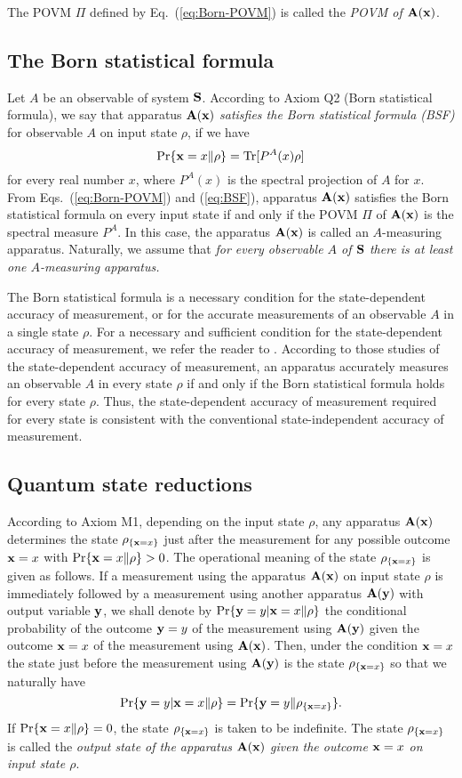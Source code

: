 \documentclass[graybox]{svmult}
\newcommand{\eeq}{\end{equation}}
\newcommand{\beql}[1]{\begin{equation}\label{eq:#1}}
\newcommand{\bA}{{\bf A}}
\newcommand{\bS}{{\bf S}}
\newcommand{\rh}{\rho}
\newcommand{\Eq}[1]{Eq.~(\ref{eq:#1})}
\newcommand{\Tr}{\mbox{\rm Tr}}
\newcommand{\bx}{{\bf x}}
\newcommand{\by}{{\bf y}}
\newcommand{\eq}[1]{(\ref{eq:#1})}
\begin{document}
The POVM $\Pi$ defined by \Eq{Born-POVM} is called the {\em POVM of
$\bA(\bx)$}.  


\subsection{The Born statistical formula}

Let $A$ be an observable of system $\bS$.
According to Axiom Q2 (Born statistical formula),
we say that apparatus $\bA(\bx)$ {\em satisfies the Born statistical
formula (BSF)} for observable $A$ on input state $\rh$, if we have
\beql{BSF}
\Pr\{\bx=x\|\rh\}=\Tr[P^{A}(x)\rh]
\eeq
for every real number $x$, 
where  $P^{A}(x)$ is the spectral projection of $A$ for $x$.
From Eqs.~\eq{Born-POVM} and \eq{BSF}, apparatus $\bA(\bx)$  
satisfies the Born statistical formula on every input state if and only if 
the POVM $\Pi$ of $\bA(\bx)$ is the spectral measure $P^{A}$.
In this case, the apparatus $\bA(\bx)$ is called an $A$-measuring apparatus.
Naturally, we assume that {\em for every observable $A$ of $\bS$ there 
is at least one $A$-measuring apparatus.}

The Born statistical formula is a necessary condition for the state-dependent
accuracy of measurement, or for the accurate measurements of an observable
$A$ in a single state $\rh$.
For a necessary and sufficient condition for the state-dependent accuracy of 
measurement, we refer the reader to \cite{05PCN,06QPC,19A1}.
According to those studies of the state-dependent accuracy of 
measurement, an apparatus accurately measures 
an observable $A$ in every state $\rh$ if and only if the Born statistical 
formula holds for every state $\rh$.  Thus, the state-dependent accuracy 
of measurement required for every state is consistent with the conventional 
state-independent accuracy of measurement.

\subsection{Quantum state reductions}
According to Axiom M1, 
depending on the input state $\rh$, 
any apparatus $\bA(\bx)$ determines the state 
$\rh_{\{\bx=x\}}$ just after the measurement for any possible 
outcome $\bx=x$ with $\Pr\{\bx=x\|\rh\}>0$. 
The operational meaning of the state $\rh_{\{\bx=x\}}$ is 
given as follows.
If a measurement using the apparatus $\bA(\bx)$ on input state $\rh$ 
is immediately followed by a measurement using another apparatus 
$\bA(\by)$ with output variable $\by$, we shall denote by
$\Pr\{\by=y|\bx=x\|\rh\}$ the conditional probability
of the outcome $\by=y$ of the measurement using $\bA(\by)$ given
the outcome $\bx=x$ of the measurement using $\bA(\bx)$.  
Then, under the condition $\bx=x$
the state just before the measurement using $\bA(\by)$ is
the state $\rh_{\{\bx=x\}}$ so that we naturally have
\beql{020603a}
\Pr\{\by=y|\bx=x\|\rh\}=\Pr\{\by=y\|\rh_{\{\bx=x\}}\}.
\eeq
If $\Pr\{\bx=x\|\rh\}=0$, the state 
$\rh_{\{\bx=x\}}$ is taken to be indefinite.
The state $\rh_{\{\bx=x\}}$ is called the {\em output
state of the apparatus $\bA(\bx)$ given 
the outcome $\bx=x$ on input state $\rh$}.
\end{document}
